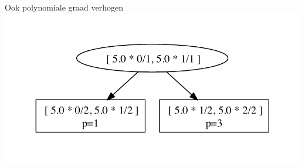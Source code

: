 \documentclass{beamer}
\begin{document}
\begin{frame}{Ook polynomiale graad verhogen}
{  \includegraphics[height=0.5\textheight]{tree_hp_3.pdf}}

\end{frame}
\end{document}
